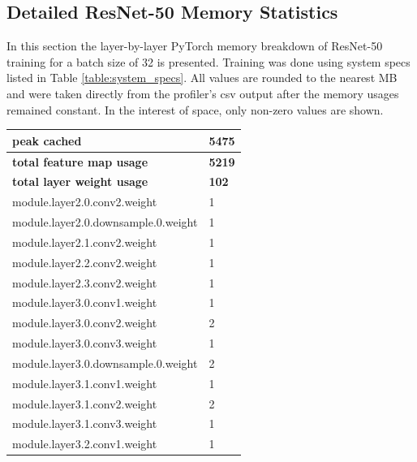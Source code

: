 \documentclass[12pt,letterpaper]{article}
\begin{document}
\newpage
\printbibliography

\newpage
\begin{appendices}


\section{Detailed ResNet-50 Memory Statistics}
\label{appendix:resnet_50_full_breakdown}
In this section the layer-by-layer PyTorch memory breakdown of ResNet-50 training for a batch size of 32 is presented. Training was done using system specs listed in Table \ref{table:system_specs}. All values are rounded to the nearest MB and were taken directly from the profiler's csv output after the memory usages remained constant. In the interest of space, only non-zero values are shown.
\begin{longtable}{@{}ll@{}}
\toprule
\textbf{peak cached}                              & \textbf{5475} \\ \midrule
\textbf{total feature map usage}                  & \textbf{5219} \\ \midrule
\textbf{total layer weight usage}                     & \textbf{102}  \\ \midrule
module.layer2.0.conv2.weight              & 1    \\ \midrule
module.layer2.0.downsample.0.weight       & 1    \\ \midrule
module.layer2.1.conv2.weight              & 1    \\ \midrule
module.layer2.2.conv2.weight              & 1    \\ \midrule
module.layer2.3.conv2.weight              & 1    \\ \midrule
module.layer3.0.conv1.weight              & 1    \\ \midrule
module.layer3.0.conv2.weight              & 2    \\ \midrule
module.layer3.0.conv3.weight              & 1    \\ \midrule
module.layer3.0.downsample.0.weight       & 2    \\ \midrule
module.layer3.1.conv1.weight              & 1    \\ \midrule
module.layer3.1.conv2.weight              & 2    \\ \midrule
module.layer3.1.conv3.weight              & 1    \\ \midrule
module.layer3.2.conv1.weight              & 1    \\ \midrule

\end{longtable}
\end{appendices}
\end{document}
